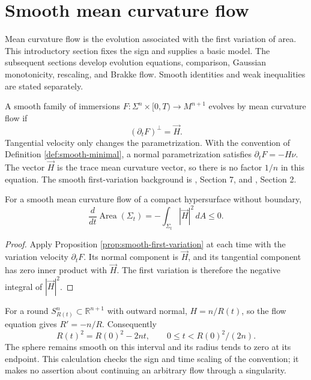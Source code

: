 \chapter{Smooth mean curvature flow}\label{sec:mean-curvature-flow}
Mean curvature flow is the evolution associated with the first variation of area. This introductory section fixes the sign and supplies a basic model. The subsequent sections develop evolution equations, comparison, Gaussian monotonicity, rescaling, and Brakke flow. Smooth identities and weak inequalities are stated separately.

\begin{definition}\label{def:mean-curvature-flow}
A smooth family of immersions $F:\Sigma^n\times[0,T)\to M^{n+1}$ evolves by mean curvature flow if
\[
 (\partial_tF)^\perp=\vec H.
\]
Tangential velocity only changes the parametrization. With the convention of Definition \ref{def:smooth-minimal}, a normal parametrization satisfies $\partial_tF=-H\nu$. The vector $\vec H$ is the trace mean curvature vector, so there is no factor $1/n$ in this equation. The smooth first-variation background is \cite{ChMin}, Section 7, and \cite{MM}, Section 2.
\end{definition}

\begin{proposition}\label{prop:mcf-area-dissipation}
For a smooth mean curvature flow of a compact hypersurface without boundary,
\[
 \frac{d}{dt}\operatorname{Area}(\Sigma_t)
 =-\int_{\Sigma_t}|\vec H|^2\,dA\leq0.
\]
\end{proposition}
\begin{proof}
Apply Proposition \ref{prop:smooth-first-variation} at each time with the variation velocity $\partial_tF$. Its normal component is $\vec H$, and its tangential component has zero inner product with $\vec H$. The first variation is therefore the negative integral of $|\vec H|^2$.
\end{proof}

\begin{example}\label{ex:shrinking-sphere}
For a round $S^n_{R(t)}\subset\mathbb R^{n+1}$ with outward normal, $H=n/R(t)$, so the flow equation gives $R'=-n/R$. Consequently
\[
 R(t)^2=R(0)^2-2nt,\qquad 0\leq t<R(0)^2/(2n).
\]
The sphere remains smooth on this interval and its radius tends to zero at its endpoint. This calculation checks the sign and time scaling of the convention; it makes no assertion about continuing an arbitrary flow through a singularity.
\end{example}

